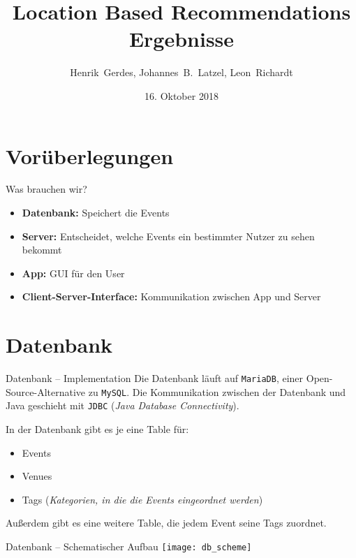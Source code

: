 \documentclass{beamer}
\title{Location Based Recommendations\\Ergebnisse}
\author[H.~Gerdes, J.B.~Latzel, L.~Richardt]{Henrik~Gerdes, Johannes~B.~Latzel, Leon~Richardt}
\institute{Universität Osnabrück}
\date[16.10.2018]{16. Oktober 2018}
\begin{document}
	
	\begin{frame}
		\titlepage
	\end{frame}

	\section{Vorüberlegungen}
	\begin{frame}{Was brauchen wir?}
			\begin{itemize}
				\item \textbf{Datenbank:} Speichert die Events
				\item \textbf{Server:} Entscheidet, welche Events ein bestimmter Nutzer zu sehen bekommt
				\item \textbf{App:} GUI für den User
				\item \textbf{Client-Server-Interface:} Kommunikation zwischen App und Server
			\end{itemize}
	\end{frame}

	\section{Datenbank}
	\begin{frame}{Datenbank -- Implementation}
		Die Datenbank läuft auf \alert{\texttt{MariaDB}}, einer Open-Source-Alternative zu \texttt{MySQL}. Die Kommunikation zwischen der Datenbank und Java geschieht mit \alert{\texttt{JDBC}} (\textit{Java Database Connectivity}).
		
		\pause
		In der Datenbank gibt es je eine Table für:
		\begin{itemize}
			\item Events
			\item Venues
			\item Tags (\textit{Kategorien, in die die Events eingeordnet werden})
		\end{itemize}
		Außerdem gibt es eine weitere Table, die jedem Event seine Tags zuordnet.
		
	\end{frame}

	\begin{frame}{Datenbank -- Schematischer Aufbau}
		\centering\texttt{[image: db\_scheme]}
	\end{frame}
\end{document}
